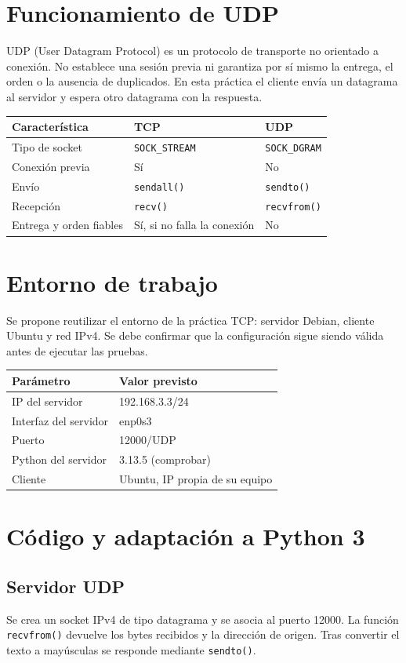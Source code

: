 \documentclass[11pt,a4paper]{article}
\begin{document}
\section{Funcionamiento de UDP}
UDP (User Datagram Protocol) es un protocolo de transporte no orientado a conexión. No establece una sesión previa ni garantiza por sí mismo la entrega, el orden o la ausencia de duplicados. En esta práctica el cliente envía un datagrama al servidor y espera otro datagrama con la respuesta.
\begin{center}
\begin{tabular}{lll}\toprule
Característica & TCP & UDP\\\midrule
Tipo de socket & \texttt{SOCK\_STREAM} & \texttt{SOCK\_DGRAM}\\
Conexión previa & Sí & No\\
Envío & \texttt{sendall()} & \texttt{sendto()}\\
Recepción & \texttt{recv()} & \texttt{recvfrom()}\\
Entrega y orden fiables & Sí, si no falla la conexión & No\\\bottomrule
\end{tabular}
\end{center}
\section{Entorno de trabajo}
Se propone reutilizar el entorno de la práctica TCP: servidor Debian, cliente Ubuntu y red IPv4. Se debe confirmar que la configuración sigue siendo válida antes de ejecutar las pruebas.
\begin{center}\begin{tabular}{ll}\toprule
Parámetro & Valor previsto\\\midrule
IP del servidor & 192.168.3.3/24\\
Interfaz del servidor & enp0s3\\
Puerto & 12000/UDP\\
Python del servidor & 3.13.5 (comprobar)\\
Cliente & Ubuntu, IP propia de su equipo\\\bottomrule\end{tabular}\end{center}
\newpage
\section{Código y adaptación a Python 3}
\subsection{Servidor UDP}
Se crea un socket IPv4 de tipo datagrama y se asocia al puerto 12000. La función \texttt{recvfrom()} devuelve los bytes recibidos y la dirección de origen. Tras convertir el texto a mayúsculas se responde mediante \texttt{sendto()}.

\end{document}
